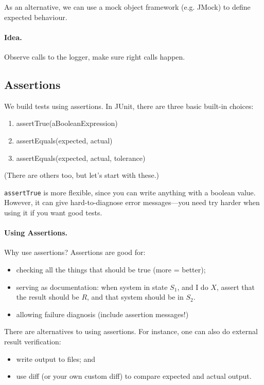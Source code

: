 \documentclass[11pt]{article}
\begin{document}
As an alternative, we can use a mock object framework (e.g. JMock) to
define expected behaviour.

\paragraph{Idea.} Observe calls to the logger,
make sure right calls happen.

\subsection*{Assertions}
We build tests using assertions. 
In JUnit, there are three basic built-in choices:
\begin{enumerate}[noitemsep]
\item assertTrue(aBooleanExpression)
\item assertEquals(expected, actual)
\item assertEquals(expected, actual, tolerance)
\end{enumerate}
(There are others too, but let's start with these.)

{\tt assertTrue} is more flexible, since you can
write anything with a boolean value. However, it can give
hard-to-diagnose error messages---you need try harder when using it
if you want good tests.

\paragraph{Using Assertions.}
Why use assertions? Assertions are good for:
\begin{itemize}[noitemsep]
\item checking all the things that should be true (more = better);
\item serving as documentation:
    when system in state $S_1$,
    and I do $X$,
    assert that the result should be $R$, and
    that system should be in $S_2$.
\item allowing failure diagnosis (include assertion messages!)
\end{itemize}

\newpage
There are alternatives to using assertions.
For instance, one can also do external result verification:
\begin{itemize}[noitemsep]
\item write output to files; and
\item use diff (or your own custom diff) to compare
  expected and actual output.
\end{itemize}
\end{document}
